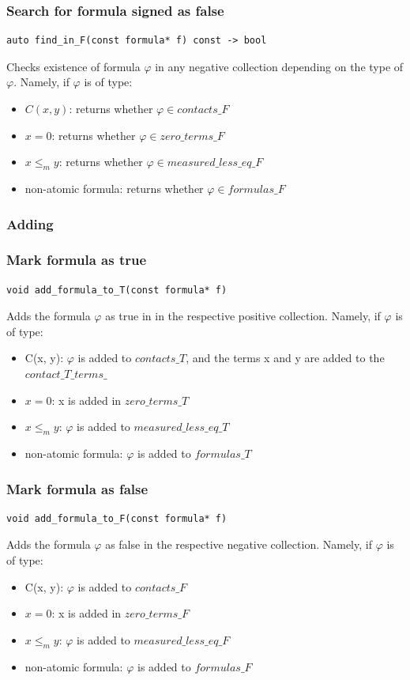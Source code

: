 \documentclass{article}
\begin{document}
	\subsubsection*{Search for formula signed as false}
\begin{lstlisting}
auto find_in_F(const formula* f) const -> bool
\end{lstlisting}
	Checks existence of formula $\varphi$ in any negative collection depending on the type of $\varphi$. Namely, if $\varphi$ is of type:
	\begin{itemize}
		\item $C(x, y)$: returns whether $\varphi \in contacts\_F$
		\item $x = 0$: returns whether $\varphi \in zero\_terms\_F$
		\item $x \le_m y$: returns whether $\varphi \in measured\_less\_eq\_F$
		\item non-atomic formula: returns whether $\varphi \in formulas\_F$
	\end{itemize}

	\subsubsection*{Adding}
	\subsubsection*{Mark formula as true}
\begin{lstlisting}
void add_formula_to_T(const formula* f)
\end{lstlisting}
	Adds the formula $\varphi$ as true in in the respective positive collection. Namely, if $\varphi$ is of type:
	\begin{itemize}
		\item C(x, y): $\varphi$ is added to $contacts\_T$, and the terms x and y are added to the $contact\_T\_terms\_$
		\item $x = 0$: x is added in $zero\_terms\_T$
		\item $x \le_m y$: $\varphi$ is added to $measured\_less\_eq\_T$
		\item non-atomic formula: $\varphi$ is added to $formulas\_T$
	\end{itemize}

	\subsubsection*{Mark formula as false}
\begin{lstlisting}
void add_formula_to_F(const formula* f)
\end{lstlisting}
	Adds the formula $\varphi$ as false in the respective negative collection. Namely, if $\varphi$ is of type:
	\begin{itemize}
		\item C(x, y): $\varphi$ is added to $contacts\_F$
		\item $x = 0$: x is added in $zero\_terms\_F$
		\item $x \le_m y$: $\varphi$ is added to $measured\_less\_eq\_F$
		\item non-atomic formula: $\varphi$ is added to $formulas\_F$
	\end{itemize}
\end{document}
